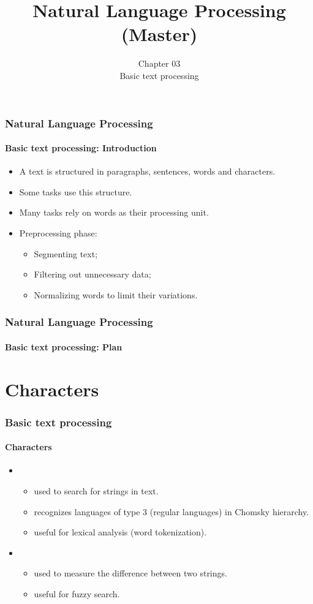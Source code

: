 \documentclass[xcolor=table]{beamer}
\subtitle[03- Basic text processing]%
{Chapter 03\\Basic text processing}
\title[ESI - NLP(master)]%
{Natural Language Processing (Master)}
\begin{document}
	
\begin{frame}
\frametitle{Natural Language Processing}
\framesubtitle{Basic text processing: Introduction}

\begin{itemize}
	\item A text is structured in paragraphs, sentences, words and characters.
	\item Some tasks use this structure.
	\item Many tasks rely on words as their processing unit.
	\item Preprocessing phase:
	\begin{itemize}
		\item Segmenting text;
		\item Filtering out unnecessary data;
		\item Normalizing words to limit their variations.
	\end{itemize}
\end{itemize}

\end{frame}


\begin{frame}
\frametitle{Natural Language Processing}
\framesubtitle{Basic text processing: Plan}

\begin{multicols}{2}
\tableofcontents
\end{multicols}
\end{frame}

\section{Characters}

\begin{frame}
\frametitle{Basic text processing}
\framesubtitle{Characters}

\begin{itemize}
	\item {}
	\begin{itemize}
		\item used to search for strings in text.
		\item recognizes languages of type 3 (regular languages) in Chomsky hierarchy.
		\item useful for lexical analysis (word tokenization).
	\end{itemize}
	\item {}
	\begin{itemize}
		\item used to measure the difference between two strings.
		\item useful for fuzzy search.
	\end{itemize}
\end{itemize}

\end{frame}
\end{document}
